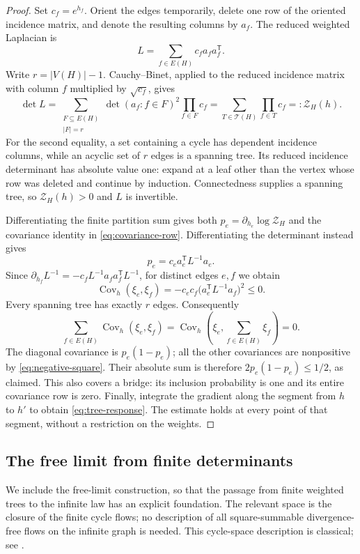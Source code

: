 \begin{proof}
Set $c_f=e^{h_f}$.  Orient the edges temporarily, delete one row of the
oriented incidence matrix, and denote the resulting columns by $a_f$.
The reduced weighted Laplacian is
\[
 L=\sum_{f\in E(H)}c_fa_fa_f^{\mathsf T}.
\]
Write $r=|V(H)|-1$.  Cauchy--Binet, applied to the reduced incidence
matrix with column $f$ multiplied by $\sqrt{c_f}$, gives
\[
 \det L
 =\sum_{\substack{F\subseteq E(H)\\|F|=r}}
   \det(a_f:f\in F)^2\prod_{f\in F}c_f
 =\sum_{T\in\mathcal T(H)}\prod_{f\in T}c_f
 =:\mathcal Z_H(h).
\]
For the second equality, a set containing a cycle has dependent
incidence columns, while an acyclic set of $r$ edges is a spanning
tree.  Its reduced incidence determinant has absolute value one:
expand at a leaf other than the vertex whose row was deleted and
continue by induction.  Connectedness supplies a spanning tree, so
$\mathcal Z_H(h)>0$ and $L$ is invertible.

Differentiating the finite partition sum gives both
$p_e=\partial_{h_e}\log\mathcal Z_H$ and the covariance identity in
\eqref{eq:covariance-row}.  Differentiating the determinant instead gives
\[
 p_e=c_ea_e^{\mathsf T}L^{-1}a_e.
\]
Since
$\partial_{h_f}L^{-1}=-c_fL^{-1}a_fa_f^{\mathsf T}L^{-1}$,
for distinct edges $e,f$ we obtain
\begin{equation}
\label{eq:negative-square}
 \operatorname{Cov}_h(\xi_e,\xi_f)
 =-c_ec_f\bigl(a_e^{\mathsf T}L^{-1}a_f\bigr)^2\le0.
\end{equation}
Every spanning tree has exactly $r$ edges.  Consequently
\[
 \sum_{f\in E(H)}\operatorname{Cov}_h(\xi_e,\xi_f)
 =\operatorname{Cov}_h\!\left(\xi_e,
                  \sum_{f\in E(H)}\xi_f\right)=0.
\]
The diagonal covariance is $p_e(1-p_e)$; all the other covariances
are nonpositive by \eqref{eq:negative-square}.  Their absolute sum
is therefore $2p_e(1-p_e)\le1/2$, as claimed.  This also covers a
bridge: its inclusion probability is one and its entire covariance
row is zero.  Finally, integrate the gradient along the segment from
$h$ to $h'$ to obtain \eqref{eq:tree-response}.  The estimate holds
at every point of that segment, without a restriction on the weights.
\end{proof}

\subsection{The free limit from finite determinants}

We include the free-limit construction, so that the passage from finite
weighted trees to the infinite law has an explicit foundation. The relevant
space is the closure of the finite cycle flows; no description of all
square-summable divergence-free flows on the infinite graph is needed.
This cycle-space description is classical; see
\cite[Proposition~7.1 and Theorem~7.8]{BLPS2001}.

